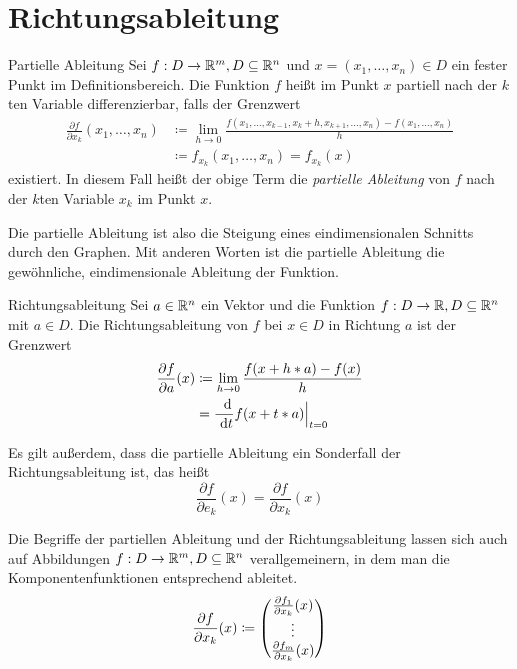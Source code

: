 \section{Richtungsableitung}
\begin{definition}{Partielle Ableitung}
	Sei $f:D\rightarrow\mathbb{R}^m,D\subseteq\mathbb{R}^n$ und $x=(x_1,\ldots,x_n)\in D$ ein fester Punkt im Definitionsbereich. Die Funktion $f$ heißt im Punkt $x$ partiell nach der $k$ten Variable differenzierbar, falls der Grenzwert
	\begin{align*}
		\frac{\partial f}{\partial x_k} (x_1,\ldots,x_n)
		&\coloneqq\lim\limits_{h\to 0}\frac{f(x_1,\ldots,x_{k-1},x_k+h,x_{k+1},\ldots,x_n)-f(x_1,\ldots,x_n)}{h}\\
		&\coloneqq f_{x_k}(x_1,\ldots,x_n) = f_{x_k}(x)
	\end{align*}
	existiert. In diesem Fall heißt der obige Term die \emph{partielle Ableitung} von $f$ nach der $k$ten Variable $x_k$ im Punkt $x$.
\end{definition}
Die partielle Ableitung ist also die Steigung eines eindimensionalen Schnitts durch den Graphen. Mit anderen Worten ist die partielle Ableitung die gewöhnliche, eindimensionale Ableitung der Funktion.

\begin{definition}{Richtungsableitung}
	Sei $a\in\mathbb{R}^n$ ein Vektor und die Funktion $f:D\rightarrow\mathbb{R},D\subseteq\mathbb{R}^n$ mit $a\in D$. Die Richtungsableitung von $f$ bei $x\in D$ in Richtung $a$ ist der Grenzwert
	\begin{align*}
		\frac{\partial f}{\partial a}(x)
		&\coloneqq \lim\limits_{h\to 0}\frac{f(x+h*a)-f(x)}{h}\\
		&=\frac{\ \operatorname{d}\!}{\ \operatorname{d}\! t}f(x+t*a)\Big|_{t=0}\\
	\end{align*}
\end{definition}
Es gilt außerdem, dass die partielle Ableitung ein Sonderfall der Richtungsableitung ist, das heißt
\begin{equation*}
	\frac{\partial f}{\partial e_k}(x)=\frac{\partial f}{\partial x_k}(x)
\end{equation*}

Die Begriffe der partiellen Ableitung und der Richtungsableitung lassen sich auch auf Abbildungen $f:D\rightarrow\mathbb{R}^m,D\subseteq \mathbb{R}^n$ verallgemeinern, in dem man die Komponentenfunktionen entsprechend ableitet.
\begin{equation*}
	\frac{\partial f}{\partial x_k}(x)\coloneqq
	\vector{
		\frac{\partial f_1}{\partial x_k}(x)\\
		\vdots\\
		\frac{\partial f_m}{\partial x_k}(x)
	}
\end{equation*}

